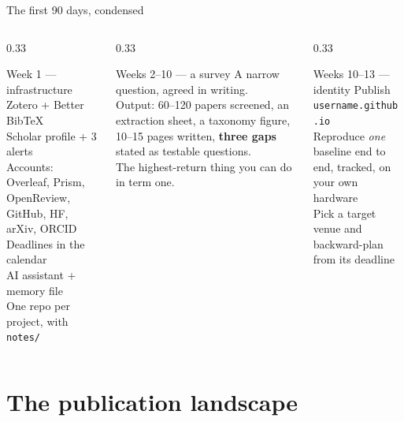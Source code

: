 \documentclass[aspectratio=169,11pt]{beamer}
\newcommand{\code}[1]{\texttt{\small #1}}
\newcommand{\key}[1]{\textbf{\color{brand}#1}}
\begin{document}
\begin{frame}{The first 90 days, condensed}
\begin{columns}[T]
\begin{column}{0.33\textwidth}
\begin{block}{Week 1 --- infrastructure}
\scriptsize
Zotero + Better BibTeX\\
Scholar profile + 3 alerts\\
Accounts: Overleaf, Prism, OpenReview, GitHub, HF, arXiv, ORCID\\
Deadlines in the calendar\\
AI assistant + memory file\\
One repo per project, with \code{notes/}
\end{block}
\end{column}
\begin{column}{0.33\textwidth}
\begin{block}{Weeks 2--10 --- a survey}
\scriptsize
A narrow question, agreed in writing.\\[4pt]
Output: 60--120 papers screened, an extraction sheet, a taxonomy figure,
10--15 pages written, \key{three gaps} stated as testable questions.\\[4pt]
The highest-return thing you can do in term one.
\end{block}
\end{column}
\begin{column}{0.33\textwidth}
\begin{block}{Weeks 10--13 --- identity}
\scriptsize
Publish \code{username.github.io}\\[4pt]
Reproduce \emph{one} baseline end to end, tracked, on your own hardware\\[4pt]
Pick a target venue and backward-plan from its deadline
\end{block}
\end{column}
\end{columns}
\end{frame}

\section{The publication landscape}
\end{document}
